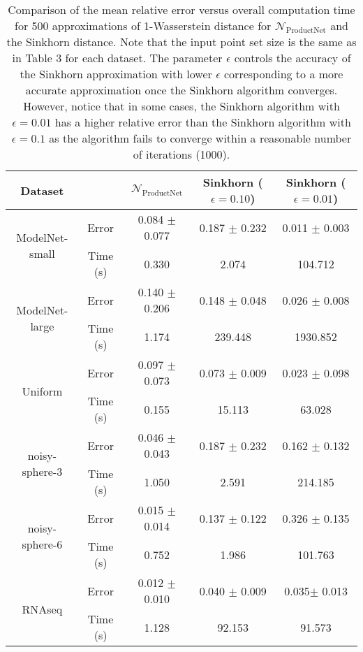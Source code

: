 \documentclass[12pt]{article}
\newcommand{\Network}{\mathcal{N}_{\mathrm{ProductNet}}}
\begin{document}
\begin{table}[]
    \centering
    \caption{Comparison of the mean relative error versus overall computation time for 500 approximations of 1-Wasserstein distance for $\Network$ and the Sinkhorn distance. Note that the input point set size is the same as in Table 3 for each dataset. The parameter $\epsilon$ controls the accuracy of the Sinkhorn approximation with lower $\epsilon$ corresponding to a more accurate approximation once the Sinkhorn algorithm converges. However, notice that in some cases, the Sinkhorn algorithm with $\epsilon = 0.01$ has a higher relative error than the Sinkhorn algorithm with $\epsilon = 0.1$ as the algorithm fails to converge within a reasonable number of iterations (1000).}
    \begin{tabular}{ccccc}
    \hline
        Dataset & &$\Network$ & Sinkhorn ($\epsilon =0.10$) & Sinkhorn ($\epsilon=0.01$) \\
        \hline
         \multirow{2}{*}{{\small ModelNet-small}} & Error & 0.084 $\pm$ 0.077 & 0.187 $\pm$ 0.232 & 0.011 $\pm$ 0.003\\
         & Time (s) & 0.330 & 2.074 & 104.712 \\
         \hline
         \multirow{2}{*}{{\small ModelNet-large}} & Error & 0.140 $\pm$ 0.206 & 0.148 $\pm$ 0.048 & 0.026 $\pm$ 0.008\\
         & Time (s) & 1.174 & 239.448 & 1930.852 \\
         \hline
         \multirow{2}{*}{{\small Uniform}} & Error & 0.097 $\pm$ 0.073 & 0.073 $\pm$ 0.009 & 0.023 $\pm$ 0.098\\
         & Time (s) & 0.155 & 15.113  &  63.028\\
         \hline
         \multirow{2}{*}{noisy-sphere-3} & Error & 0.046 $\pm$ 0.043 & 0.187 $\pm$ 0.232 & 0.162 $\pm$ 0.132\\
         & Time (s) & 1.050 & 2.591 & 214.185\\
         \hline
         \multirow{2}{*}{noisy-sphere-6} & Error & 0.015 $\pm$ 0.014 & 0.137 $\pm$ 0.122 & 0.326 $\pm$ 0.135\\
         & Time (s) & 0.752 & 1.986 & 101.763\\
         \hline
         \multirow{2}{*}{RNAseq} & Error & 0.012 $\pm$ 0.010 & 0.040 $\pm$ 0.009 & 0.035$\pm$ 0.013\\
         & Time (s) & 1.128 & 92.153 & 91.573\\
         \hline
    \end{tabular}
    \label{tab:computation-time-comparison}
\end{table}
\end{document}
